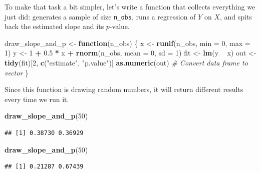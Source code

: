 \documentclass[12pt,oneside,openany]{book}
\newenvironment{Shaded}{\begin{snugshade}}{\end{snugshade}}
\newcommand{\KeywordTok}[1]{\textcolor[rgb]{0.13,0.29,0.53}{\textbf{#1}}}
\newcommand{\DataTypeTok}[1]{\textcolor[rgb]{0.13,0.29,0.53}{#1}}
\newcommand{\DecValTok}[1]{\textcolor[rgb]{0.00,0.00,0.81}{#1}}
\newcommand{\FloatTok}[1]{\textcolor[rgb]{0.00,0.00,0.81}{#1}}
\newcommand{\StringTok}[1]{\textcolor[rgb]{0.31,0.60,0.02}{#1}}
\newcommand{\CommentTok}[1]{\textcolor[rgb]{0.56,0.35,0.01}{\textit{#1}}}
\newcommand{\ControlFlowTok}[1]{\textcolor[rgb]{0.13,0.29,0.53}{\textbf{#1}}}
\newcommand{\OperatorTok}[1]{\textcolor[rgb]{0.81,0.36,0.00}{\textbf{#1}}}
\newcommand{\NormalTok}[1]{#1}
\begin{document}
To make that task a bit simpler, let's write a function that collects
everything we just did: generates a sample of size \texttt{n\_obs}, runs
a regression of \(Y\) on \(X\), and spits back the estimated slope and
its \(p\)-value.

\begin{Shaded}
\begin{Highlighting}[]
\NormalTok{draw_slope_and_p <-}\StringTok{ }\ControlFlowTok{function}\NormalTok{(n_obs) \{}
\NormalTok{    x <-}\StringTok{ }\KeywordTok{runif}\NormalTok{(n_obs, }\DataTypeTok{min =} \DecValTok{0}\NormalTok{, }\DataTypeTok{max =} \DecValTok{1}\NormalTok{)}
\NormalTok{    y <-}\StringTok{ }\DecValTok{1} \OperatorTok{+}\StringTok{ }\FloatTok{0.5} \OperatorTok{*}\StringTok{ }\NormalTok{x }\OperatorTok{+}\StringTok{ }\KeywordTok{rnorm}\NormalTok{(n_obs, }\DataTypeTok{mean =} \DecValTok{0}\NormalTok{, }\DataTypeTok{sd =} \DecValTok{1}\NormalTok{)}
\NormalTok{    fit <-}\StringTok{ }\KeywordTok{lm}\NormalTok{(y }\OperatorTok{~}\StringTok{ }\NormalTok{x)}
\NormalTok{    out <-}\StringTok{ }\KeywordTok{tidy}\NormalTok{(fit)[}\DecValTok{2}\NormalTok{, }\KeywordTok{c}\NormalTok{(}\StringTok{"estimate"}\NormalTok{, }\StringTok{"p.value"}\NormalTok{)]}
    \KeywordTok{as.numeric}\NormalTok{(out)  }\CommentTok{# Convert data frame to vector}
\NormalTok{\}}
\end{Highlighting}
\end{Shaded}

Since this function is drawing random numbers, it will return different
results every time we run it.

\begin{Shaded}
\begin{Highlighting}[]
\KeywordTok{draw_slope_and_p}\NormalTok{(}\DecValTok{50}\NormalTok{)}
\end{Highlighting}
\end{Shaded}

\begin{verbatim}
## [1] 0.38730 0.36929
\end{verbatim}

\begin{Shaded}
\begin{Highlighting}[]
\KeywordTok{draw_slope_and_p}\NormalTok{(}\DecValTok{50}\NormalTok{)}
\end{Highlighting}
\end{Shaded}

\begin{verbatim}
## [1] 0.21287 0.67439
\end{verbatim}
\end{document}
